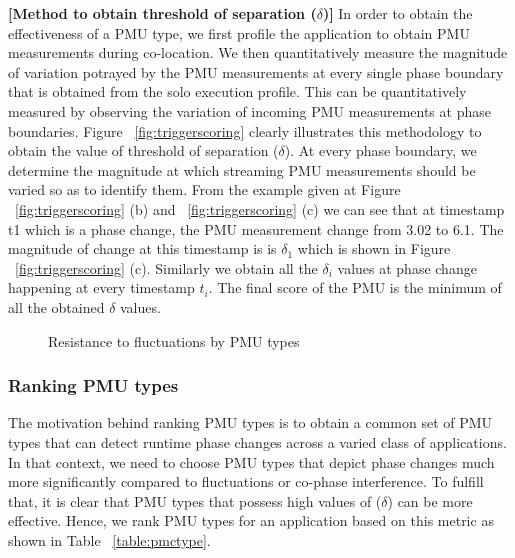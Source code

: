 \documentclass{sig-alternate}
\begin{document}
\textbf{[Method to obtain threshold of separation ($\delta$)]} In order to obtain the effectiveness of a PMU type, we first profile the application to obtain PMU measurements during co-location. We then quantitatively measure the magnitude of variation potrayed by the PMU measurements at every single phase boundary that is obtained from the solo execution profile. This can be quantitatively measured by observing the variation of incoming PMU measurements at phase boundaries. Figure ~\ref{fig:triggerscoring} clearly illustrates this methodology to obtain the value of threshold of separation ($\delta$). At every phase boundary, we determine the magnitude at which streaming PMU measurements should be varied so as to identify them. From the example given at Figure ~\ref{fig:triggerscoring} (b)  and ~\ref{fig:triggerscoring} (c) we can see that at timestamp t1 which is a phase change, the PMU measurement change from 3.02 to 6.1. The magnitude of change at this timestamp is is $\delta_{1}$ which is shown in Figure ~\ref{fig:triggerscoring} (c). Similarly we obtain all the $\delta_{i}$ values at phase change happening at every timestamp $t_{i}$. The final score of the PMU is the minimum of all the obtained $\delta$ values. 

\begin{figure}
\centering
\begin{minipage}[t]{1\columnwidth}
\centering
{}
\caption{Resistance to fluctuations by PMU types}
\label{fig:fluctuations}
\end{minipage}
\end{figure}
\subsubsection{Ranking PMU types}
\label{subsubsec:RankingPMUtypes}

The motivation behind ranking PMU types is to obtain a common set of PMU types that can detect runtime phase changes across a varied class of applications. In that context, we need to choose PMU types that depict phase changes much more significantly compared to fluctuations or co-phase interference. To fulfill that, it is clear that PMU types that possess high values of ($\delta$) can be more effective. Hence, we rank PMU types for an application based on this metric as shown in Table ~\ref{table:pmctype}. 
\end{document}
